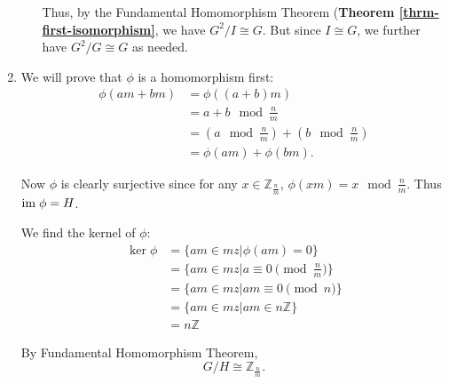 \begin{enumerate}
\begin{enumerate}[label=(\roman*)]
        Thus, by the Fundamental Homomorphism Theorem (\textbf{Theorem \ref{thrm-first-isomorphism}}, we have $G^2 / I \cong G$. But since $I \cong G$, we further have $G^2/G \cong G$ as needed.
    \end{enumerate}

    \item We will prove that $\phi$ is a homomorphism first:
    \begin{align*}
        \phi(am + bm) &= \phi((a+b)m)\\
        &= a+b \mod \frac nm\\
        &= (a \mod \frac nm) + (b \mod \frac nm)\\
        &= \phi(am) + \phi(bm).
    \end{align*}

    Now $\phi$ is clearly surjective since for any $x \in \mathbb{Z}_{\frac nm}$, $\phi(xm) = x \mod \frac nm$. Thus $\mathrm{im}\;\phi = H$.

    We find the kernel of $\phi$:
    \begin{align*}
        \ker\phi &= \{am \in mz \vert \phi(am) = 0\}\\
        &= \{am \in mz \vert a \equiv 0 \pmod{\frac nm}\}\\
        &= \{am \in mz \vert am \equiv 0 \pmod{n}\}\\
        &= \{am \in mz \vert am \in n\mathbb{Z}\}\\
        &= n\mathbb{Z}
    \end{align*}

    By Fundamental Homomorphism Theorem,
    \[
        G/H \cong \mathbb{Z}_{\frac nm}.
    \]
\end{enumerate}

